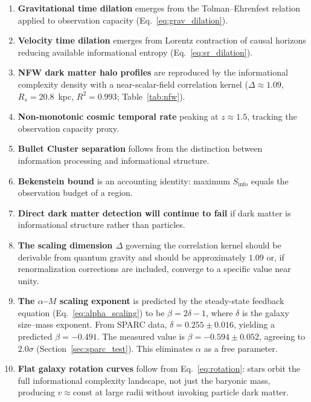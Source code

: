 \documentclass[12pt,a4paper]{article}
\begin{document}
\begin{enumerate}
    \item \textbf{Gravitational time dilation} emerges from the Tolman--Ehrenfest relation applied to observation capacity (Eq.~\ref{eq:grav_dilation}).
    
    \item \textbf{Velocity time dilation} emerges from Lorentz contraction of causal horizons reducing available informational entropy (Eq.~\ref{eq:sr_dilation}).
    
    \item \textbf{NFW dark matter halo profiles} are reproduced by the informational complexity density with a near-scalar-field correlation kernel ($\Delta \approx 1.09$, $R_s = 20.8$~kpc, $R^2 = 0.993$; Table~\ref{tab:nfw}).
    
    \item \textbf{Non-monotonic cosmic temporal rate} peaking at $z \approx 1.5$, tracking the observation capacity proxy.
    
    \item \textbf{Bullet Cluster separation} follows from the distinction between information processing and informational structure.
    
    \item \textbf{Bekenstein bound} is an accounting identity: maximum $S_{\mathrm{info}}$ equals the observation budget of a region.
    
    \item \textbf{Direct dark matter detection will continue to fail} if dark matter is informational structure rather than particles.
    
    \item \textbf{The scaling dimension $\Delta$} governing the correlation kernel should be derivable from quantum gravity and should be approximately $1.09$ or, if renormalization corrections are included, converge to a specific value near unity.
    
    \item \textbf{The $\alpha$--$M$ scaling exponent} is predicted by the steady-state feedback equation (Eq.~\ref{eq:alpha_scaling}) to be $\beta = 2\delta - 1$, where $\delta$ is the galaxy size--mass exponent. From SPARC data, $\delta = 0.255 \pm 0.016$, yielding a predicted $\beta = -0.491$. The measured value is $\beta = -0.594 \pm 0.052$, agreeing to $2.0\sigma$ (Section~\ref{sec:sparc_test}). This eliminates $\alpha$ as a free parameter.
    
    \item \textbf{Flat galaxy rotation curves} follow from Eq.~\eqref{eq:rotation}: stars orbit the full informational complexity landscape, not just the baryonic mass, producing $v \approx \mathrm{const}$ at large radii without invoking particle dark matter.
    

\end{enumerate}
\end{document}
